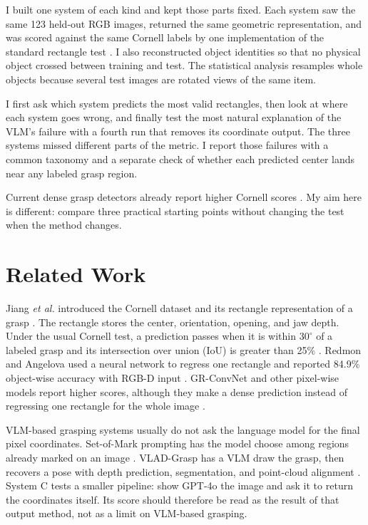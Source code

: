 \documentclass[10pt,conference]{IEEEtran}
\begin{document}
I built one system of each kind and kept those parts fixed. Each system saw
the same 123 held-out RGB images, returned the same geometric representation,
and was scored against the same Cornell labels by one implementation of the
standard rectangle test \cite{jiang2011,lenz2015}. I also reconstructed
object identities so that no physical object crossed between training and
test. The statistical analysis resamples whole objects because several test
images are rotated views of the same item.

I first ask which system predicts the most valid rectangles, then look at
where each system goes wrong, and finally test the most natural explanation
of the VLM's failure with a fourth run that removes its coordinate output. The three systems missed different parts of the
metric. I report those failures with a common taxonomy and a separate check
of whether each predicted center lands near any labeled grasp region.

Current dense grasp detectors already report higher Cornell scores
\cite{kumra2020}. My aim here is different: compare three practical starting
points without changing the test when the method changes.

\section{Related Work}

Jiang \emph{et al.} introduced the Cornell dataset and its rectangle
representation of a grasp \cite{jiang2011}. The rectangle stores the center,
orientation, opening, and jaw depth. Under the usual Cornell test, a
prediction passes when it is within $30^\circ$ of a labeled grasp and its
intersection over union (IoU) is greater than 25\% \cite{lenz2015}. Redmon
and Angelova used a neural network to regress one rectangle and reported
84.9\% object-wise accuracy with RGB-D input \cite{redmon2015}. GR-ConvNet
and other pixel-wise models report higher scores, although they make a dense
prediction instead of regressing one rectangle for the whole image
\cite{kumra2020}.

VLM-based grasping systems usually do not ask the language model for the final
pixel coordinates. Set-of-Mark prompting has the model choose among regions
already marked on an image \cite{yang2024}. VLAD-Grasp has a VLM draw the
grasp, then recovers a pose with depth prediction, segmentation, and
point-cloud alignment \cite{kulshrestha2025}. System C tests a smaller
pipeline: show GPT-4o the image and ask it to return the coordinates itself.
Its score should therefore be read as the result of that output method, not
as a limit on VLM-based grasping.
\end{document}
